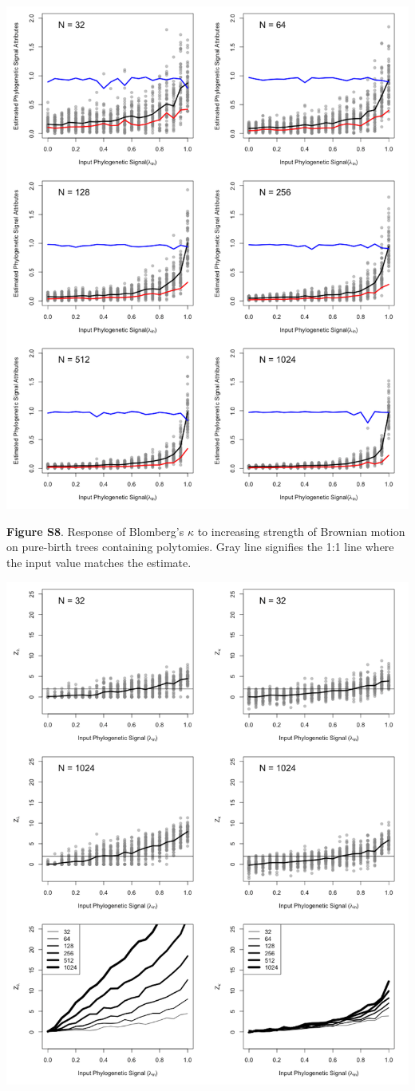 \documentclass[
]{article}
\begin{document}
\includegraphics[width=0.95\linewidth]{fig.S8}

\textbf{Figure S8}. Response of Blomberg's \(\kappa\) to increasing
strength of Brownian motion on pure-birth trees containing polytomies.
Gray line signifies the 1:1 line where the input value matches the
estimate.

\includegraphics[width=0.95\linewidth]{fig.S9}
\end{document}
